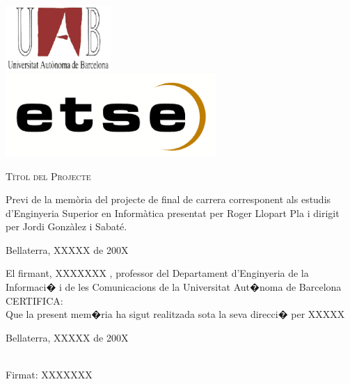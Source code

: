 \documentclass[a4paper,12pt,catalan]{book}
\begin{document}

\pagestyle{plain}
\thispagestyle{empty}


\vspace{0.39cm}
\begin{center}
\includegraphics[width=4cm]{figs/uab.eps}\\
\includegraphics[width=8cm]{figs/etse.eps}
\end{center}
\vspace{0.39cm}

\vfill{}

{\par\centering \textsc{\Large Títol del Projecte}\par}
\vfill{}

\begin{center}

\begin{minipage}[t]{0.65\columnwidth}
Previ de la memòria del projecte de final de carrera corresponent als estudis 
d'Enginyeria Superior en Informàtica presentat per Roger Llopart Pla
i dirigit per Jordi Gonzàlez i Sabaté.

\end{minipage}
\medskip


\end{center}

\vfill{}
{\par\centering Bellaterra, XXXXX de 200X \par}


\newpage \vspace*{6 true cm} \begin{center} \begin{minipage}{4in}
\parindent=0pt El firmant, XXXXXXX , professor del Departament d'Enginyeria de la Informaci� i de les Comunicacions de la Universitat Aut�noma de Barcelona \\

CERTIFICA:\\

Que la present mem�ria ha sigut realitzada sota la seva direcci� per
XXXXX \par \vspace*{.5in} Bellaterra, XXXXX de 200X
\vspace*{.5in}
\begin{center} \vrule width 3in height 0.4pt\\Firmat: XXXXXXX
\end{center} \end{minipage} \end{center}
\end{document}
